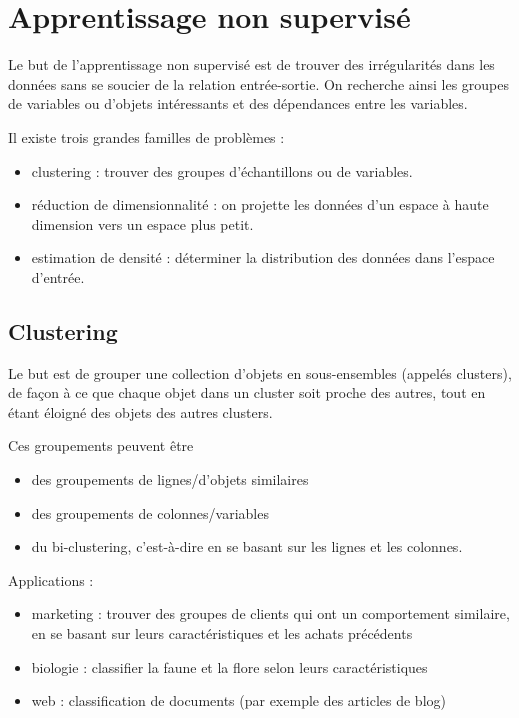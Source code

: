 \chapter{Apprentissage non supervisé}

Le but de l'apprentissage non supervisé est de trouver des irrégularités dans les données sans se soucier de la relation entrée-sortie. On recherche ainsi les groupes de variables ou d'objets intéressants et des dépendances entre les variables.

Il existe trois grandes familles de problèmes :

\begin{itemize}
	\item clustering : trouver des groupes d'échantillons ou de variables.
	\item réduction de dimensionnalité : on projette les données d'un espace à haute dimension vers un espace plus petit.
	\item estimation de densité : déterminer la distribution des données dans l'espace d'entrée.
\end{itemize}

\section{Clustering}

Le but est de grouper une collection d'objets en sous-ensembles (appelés clusters), de façon à ce que chaque objet dans un cluster soit proche des autres, tout en étant éloigné des objets des autres clusters.
	
Ces groupements peuvent être

\begin{itemize}
	\item des groupements de lignes/d'objets similaires
	\item des groupements de colonnes/variables
	\item du bi-clustering, c'est-à-dire en se basant sur les lignes et les colonnes.
\end{itemize}


Applications :

\begin{itemize}
	\item marketing : trouver des groupes de clients qui ont un comportement similaire, en se basant sur leurs caractéristiques et les achats précédents
	\item biologie : classifier la faune et la flore selon leurs caractéristiques
	\item web : classification de documents (par exemple des articles de blog)
\end{itemize}

